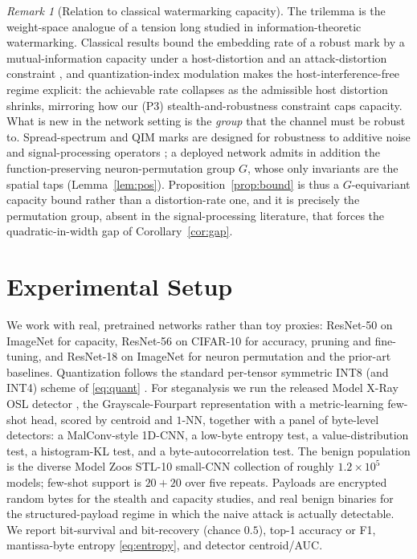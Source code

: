 \documentclass[10pt,journal]{IEEEtran}
\theoremstyle{remark}
\newtheorem{remark}{Remark}
\begin{document}
\begin{remark}[Relation to classical watermarking capacity]\label{rem:classical}
The trilemma is the weight-space analogue of a tension long studied in
information-theoretic watermarking. Classical results bound the embedding rate of a
robust mark by a mutual-information capacity under a host-distortion and an
attack-distortion constraint \cite{moulin2003watermarking}, and quantization-index
modulation \cite{chen2001qim} makes the host-interference-free regime explicit: the
achievable rate collapses as the admissible host distortion shrinks, mirroring how our
(P3) stealth-and-robustness constraint caps capacity. What is new in the network setting
is the \emph{group} that the channel must be robust to. Spread-spectrum and QIM marks are
designed for robustness to additive noise and signal-processing operators
\cite{cox1997spread,chen2001qim}; a deployed network admits in addition the
function-preserving neuron-permutation group $G$, whose only invariants are the spatial
taps (Lemma~\ref{lem:pos}). Proposition~\ref{prop:bound} is thus a $G$-equivariant
capacity bound rather than a distortion-rate one, and it is precisely the permutation
group, absent in the signal-processing literature, that forces the quadratic-in-width gap
of Corollary~\ref{cor:gap}.
\end{remark}

\section{Experimental Setup}\label{sec:setup}
We work with real, pretrained networks rather than toy proxies: ResNet-50
\cite{he2016resnet} on ImageNet \cite{deng2009imagenet} for capacity, ResNet-56 on
CIFAR-10 \cite{krizhevsky2009cifar} for accuracy, pruning and fine-tuning, and
ResNet-18 on ImageNet for neuron permutation and the prior-art baselines. Quantization
follows the standard per-tensor symmetric INT8 (and INT4) scheme of \eqref{eq:quant}
\cite{nagel2021whitepaper}.
For steganalysis we run the released Model X-Ray OSL detector
\cite{gilkarov2026modelxray}, the Grayscale-Fourpart representation with a
metric-learning few-shot head, scored by centroid and $1$-NN, together with a panel
of byte-level detectors: a MalConv-style 1D-CNN, a low-byte entropy test, a
value-distribution test, a histogram-KL test, and a byte-autocorrelation test. The
benign population is the diverse Model Zoos STL-10 small-CNN collection
\cite{schurholt2022modelzoos} of roughly $1.2\times10^{5}$ models; few-shot support is
$20{+}20$ over five repeats. Payloads are encrypted random
bytes for the stealth and capacity studies, and real benign binaries for the
structured-payload regime in which the naive attack is actually detectable. We report
bit-survival and bit-recovery (chance $0.5$), top-1 accuracy or F1, mantissa-byte
entropy \eqref{eq:entropy}, and detector centroid/AUC.
\end{document}
